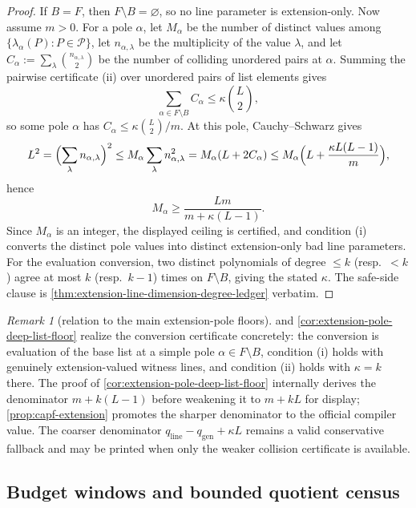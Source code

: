 \documentclass[11pt]{article}
\theoremstyle{definition}
\theoremstyle{remark}
\newtheorem{remark}[remark]{Remark}
\begin{document}
\begin{proof}
If $B=F$, then $F\setminus B=\varnothing$, so no line parameter is extension-only.  Now assume $m>0$.  For a pole $\alpha$, let $M_\alpha$ be the number of distinct values among $\{\lambda_\alpha(P):P\in\mathcal P\}$, let $n_{\alpha,\lambda}$ be the multiplicity of the value $\lambda$, and let $C_\alpha:=\sum_\lambda\binom{n_{\alpha,\lambda}}2$ be the number of colliding unordered pairs at $\alpha$.  Summing the pairwise certificate \textup{(ii)} over unordered pairs of list elements gives
\[
        \sum_{\alpha\in F\setminus B}C_\alpha
        \le \kappa\binom L2 ,
\]
so some pole $\alpha$ has $C_\alpha\le \kappa\binom L2/m$.  At this pole, Cauchy--Schwarz gives
\[
        L^2
        =\Bigl(\sum_\lambda n_{\alpha,\lambda}\Bigr)^2
        \le
        M_\alpha\sum_\lambda n_{\alpha,\lambda}^2
        =M_\alpha(L+2C_\alpha)
        \le
        M_\alpha\Bigl(L+\frac{\kappa L(L-1)}m\Bigr),
\]
hence
\[
        M_\alpha\ge \frac{Lm}{m+\kappa(L-1)} .
\]
Since $M_\alpha$ is an integer, the displayed ceiling is certified, and condition \textup{(i)} converts the distinct pole values into distinct extension-only bad line parameters.  For the evaluation conversion, two distinct polynomials of degree $\le k$ \textup{(resp.\ $<k$)} agree at most $k$ \textup{(resp.\ $k-1$)} times on $F\setminus B$, giving the stated $\kappa$.  The safe-side clause is \cref{thm:extension-line-dimension-degree-ledger} verbatim.
\end{proof}

\begin{remark}[relation to the main extension-pole floors]\label{rem:capf-extension-main}
 and \cref{cor:extension-pole-deep-list-floor} realize the conversion certificate concretely: the conversion is evaluation of the base list at a simple pole $\alpha\in F\setminus B$, condition \textup{(i)} holds with genuinely extension-valued witness lines, and condition \textup{(ii)} holds with $\kappa=k$ there.  The proof of \cref{cor:extension-pole-deep-list-floor} internally derives the denominator $m+k(L-1)$ before weakening it to $m+kL$ for display; \cref{prop:capf-extension} promotes the sharper denominator to the official compiler value.  The coarser denominator $q_{\mathrm{line}}-q_{\mathrm{gen}}+\kappa L$ remains a valid conservative fallback and may be printed when only the weaker collision certificate is available.
\end{remark}

\subsection{Budget windows and bounded quotient census}
\end{document}
